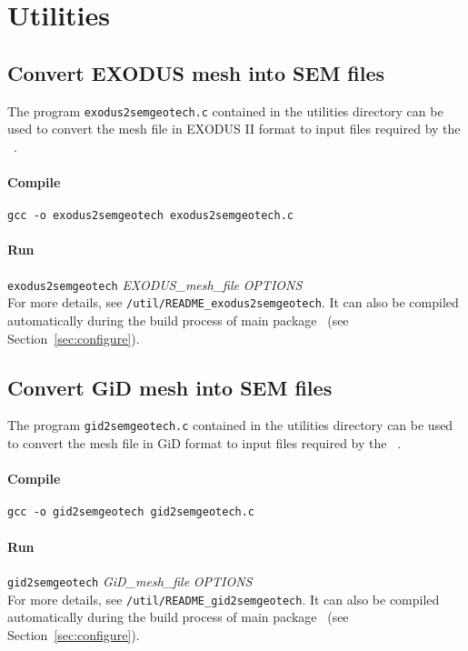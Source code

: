 \chapter{Utilities}
\label{chap:util}
\section{Convert EXODUS mesh into SEM files}

The program \texttt{exodus2semgeotech.c} contained in the utilities directory can be used to convert the mesh file in EXODUS II format to input files required by the \pack\ .

\subsubsection*{Compile}
\texttt{gcc -o exodus2semgeotech exodus2semgeotech.c}
\subsubsection*{Run}
 \texttt{exodus2semgeotech} {\emph{EXODUS\_mesh\_file}} {\emph{OPTIONS}}\\
 For more details, see \texttt{/util/README\_exodus2semgeotech}. It can also be compiled automatically during the build process of main package \pack\ (see Section~\ref{sec:configure}).

\section{Convert GiD mesh into SEM files}

The program \texttt{gid2semgeotech.c} contained in the utilities directory can be used to convert the mesh file in GiD format to input files required by the \pack\ .

\subsubsection*{Compile}
\texttt{gcc -o gid2semgeotech gid2semgeotech.c}
\subsubsection*{Run}
 \texttt{gid2semgeotech} {\emph{GiD\_mesh\_file}} {\emph{OPTIONS}}\\
 For more details, see \texttt{/util/README\_gid2semgeotech}. It can also be compiled automatically during the build process of main package \pack\ (see Section~\ref{sec:configure}).


